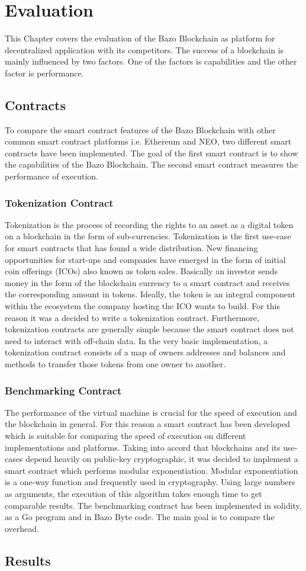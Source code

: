 \chapter{Evaluation}
This Chapter covers the evaluation of the Bazo Blockchain as platform for decentralized application with its competitors. The success of a blockchain is mainly influenced by two factors. One of the factors is capabilities and the other factor is performance. 

\section{Contracts}
To compare the smart contract features of the Bazo Blockchain  with other common smart contract platforms i.e. Ethereum and NEO, two different smart contracts have been implemented. The goal of the first smart contract is to show the capabilities of the Bazo Blockchain. The second smart contract measures the performance of execution.

\subsection{Tokenization Contract}
Tokenization is the process of recording the rights to an asset as a digital token on a blockchain in the form of sub-currencies. \cite{eth_whitepaper} Tokenization is the first use-case for smart contracts that has found a wide distribution. New financing opportunities for start-ups and companies have emerged in the form of initial coin offerings (ICOs) also known as token sales. Basically an investor sends money in the form of the blockchain currency to a smart contract and receives the corresponding amount in tokens. Ideally, the token is an integral component within the ecosystem the company hosting the ICO wants to build. For this reason it was a decided to write a tokenization contract. Furthermore, tokenization contracts are generally simple because the smart contract does not need to interact with off-chain data. In the very basic implementation, a tokenization contract consists of a map of owners addresses and balances and methods to transfer those tokens from one owner to another.

\subsection{Benchmarking Contract}
The performance of the virtual machine is crucial for the speed of execution and the blockchain in general. For this reason a smart contract has been developed which is suitable for comparing the speed of execution on different implementations and platforms. Taking into accord that blockchains and its use-cases depend heavily on public-key cryptographic, it was decided to implement a smart contract which performs modular exponentiation. Modular exponentiation is a one-way function and frequently used in cryptography. Using large numbers as arguments, the execution of this algorithm takes enough time to get comparable results. The benchmarking contract has been implemented in solidity, as a Go program and in Bazo Byte code. The main goal is to compare the overhead.

\section{Results}
